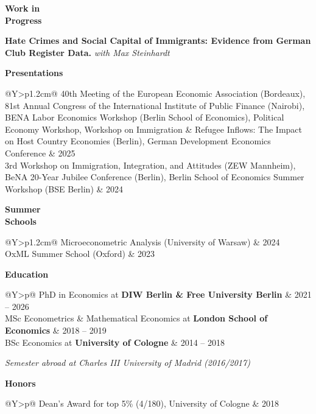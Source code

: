 \documentclass[a4paper,9pt]{extarticle}
\newlength{\lw}\setlength{\lw}{1.95cm}
\newlength{\sw}\setlength{\sw}{0.15cm}
\newlength{\cw}\setlength{\cw}{\dimexpr\textwidth-\lw-\sw\relax}
\newlength{\dw}\setlength{\dw}{3.5cm}
\newcommand{\cvsection}[2]{%
  \vspace{1.6em}%
  \noindent
  \parbox[t]{\lw}{\vspace{0pt}\raggedright\textbf{#1}}%
  \hspace{\sw}%
  \parbox[t]{\cw}{\vspace{0pt}\raggedright #2}%
  \par
}
\newcommand{\cvtabsection}[2]{%
  \vspace{1.6em}%
  \noindent
  \parbox[t]{\lw}{\vspace{0pt}\raggedright\textbf{#1}}%
  \hspace{\sw}%
  \parbox[t]{\cw}{\vspace{-3pt}\raggedright #2}%
  \par
}
\newcommand{\cvsubdetail}[1]{\par\hspace{1em}\textit{#1}}
\begin{document}
\cvsection{Work in\\Progress}{%
  \textbf{Hate Crimes and Social Capital of Immigrants: Evidence from German Club Register Data.}%
  \newline\textit{with Max Steinhardt}%
}

\cvtabsection{Presentations}{%
  \begin{tabularx}{\cw}{@{}Y>{\raggedleft\arraybackslash}p{1.2cm}@{}}
    40th Meeting of the European Economic Association (Bordeaux),
    81st Annual Congress of the International Institute of Public Finance (Nairobi),
    BENA Labor Economics Workshop (Berlin School of Economics),
    Political Economy Workshop,
    Workshop on Immigration \& Refugee Inflows: The Impact on Host Country Economies (Berlin),
    German Development Economics Conference
    & 2025 \\
    3rd Workshop on Immigration, Integration, and Attitudes (ZEW Mannheim),
    BeNA 20-Year Jubilee Conference (Berlin),
    Berlin School of Economics Summer Workshop (BSE Berlin)
    & 2024 \\
  \end{tabularx}%
}

\cvtabsection{Summer\\Schools}{%
  \begin{tabularx}{\cw}{@{}Y>{\raggedleft\arraybackslash}p{1.2cm}@{}}
    Microeconometric Analysis (University of Warsaw)
    & 2024 \\
    OxML Summer School (Oxford)
    & 2023 \\
  \end{tabularx}%
}

\cvtabsection{Education}{%
  \begin{tabularx}{\cw}{@{}Y>{\raggedleft\arraybackslash}p{\dw}@{}}
    PhD in Economics at \textbf{DIW Berlin \& Free University Berlin} & 2021 -- 2026 \\
    MSc Econometrics \& Mathematical Economics at \textbf{London School of Economics} & 2018 -- 2019 \\
    BSc Economics at \textbf{University of Cologne} & 2014 -- 2018 \\
  \end{tabularx}%
  \cvsubdetail{Semester abroad at Charles III University of Madrid (2016/2017)}%
}

\cvtabsection{Honors}{%
  \begin{tabularx}{\cw}{@{}Y>{\raggedleft\arraybackslash}p{\dw}@{}}
    Dean's Award for top 5\% (4/180), University of Cologne & 2018 \\
  \end{tabularx}%
}
\end{document}
